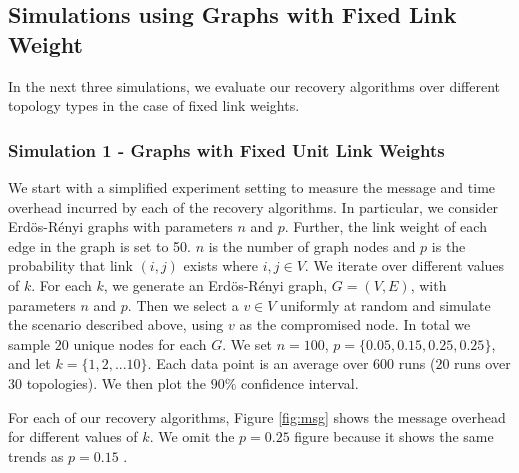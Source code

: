 \subsection{Simulations using Graphs with Fixed Link Weight}
\label{subsec:simulation-fixed}

In the next three simulations, we evaluate our recovery algorithms over different topology types in the case of fixed link weights.

\subsubsection{Simulation 1 - \er Graphs with Fixed Unit Link Weights}
\label{subsubsec:expt1}

We start with a simplified experiment setting to measure the 
 message and time overhead incurred by each of the recovery
 algorithms. In particular, we consider 
Erd\"{o}s-R\'enyi graphs with parameters $n$ and $p$. Further, the
link weight of each edge in the graph is set to 50.
$n$ is the number of graph nodes and $p$ is the probability that link $(i,j)$ exists where $i,j \in V$. We iterate over different values of $k$. For each $k$, we 
generate an Erd\"{o}s-R\'enyi graph, $G = (V,E)$, with parameters $n$ and $p$. Then we select a $v \in V$ uniformly at random and simulate the scenario described above, 
using $v$ as the compromised node. In total we sample $20$ unique nodes for each $G$.
We set $n=100$, $p=\{0.05,0.15,0.25, 0.25\}$, and let $k=\{1,2,
... 10\}$. Each data point is an average over $600$ runs ($20$ runs over 
$30$ topologies).  We then plot the $90 \%$ confidence interval.

For each of our recovery algorithms, Figure \ref{fig:msg} shows the
message overhead for different values of $k$. %
We omit the $p=0.25$ figure because it shows the same trends as $p=0.15$ \cite{Tech}. 

\begin{figure*}[t]
\centering
{}

\caption{Message overhead as function of the number of hops false routing state has spread from the compromised node ($k$), over \er graphs with fixed link weights. Note the y-axes have different 
scales.}
\label{fig:msg}
\end{figure*}

